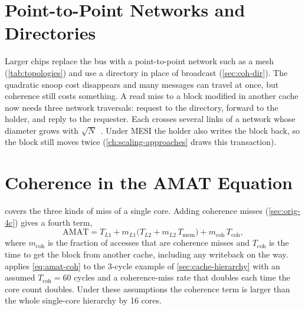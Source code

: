 \section{Point-to-Point Networks and Directories}
\label{sec:scale-p2p}
%

Larger chips replace the bus with a point-to-point network such as a mesh
(\cref{tab:topologies}) and use a directory in place of broadcast
(\cref{sec:coh-dir}). The quadratic snoop cost disappears and many messages can
travel at once, but coherence still costs something. A read miss to a block
modified in another cache now needs three network traversals: request to the
directory, forward to the holder, and reply to the requester. Each crosses several
links of a network whose diameter grows with
$\sqrt{N}$~\cite[\S12.6.3]{sarangi2025basic}. Under MESI the holder also writes
the block back, so the block still moves twice (\cref{ch:scaling-approaches}
draws this transaction).

\section{Coherence in the AMAT Equation}
\label{sec:scale-amat}
%

 covers the three kinds of miss of a single core. Adding coherence
misses (\cref{sec:orig-4c}) gives a fourth term,
\begin{equation}
  \mathrm{AMAT} = T_{L1} + m_{L1}\bigl(T_{L2} + m_{L2}\,T_{\mathrm{mem}}\bigr)
                + m_{\mathrm{coh}}\,T_{\mathrm{coh}},
  \label{eq:amat-coh}
\end{equation}
where $m_{\mathrm{coh}}$ is the fraction of accesses that are coherence misses and
$T_{\mathrm{coh}}$ is the time to get the block from another cache, including any
writeback on the way.  applies \cref{eq:amat-coh} to the
3-cycle example of \cref{sec:cache-hierarchy} with an assumed
$T_{\mathrm{coh}}=60$ cycles and a coherence-miss rate that doubles each time the
core count doubles. Under these assumptions the coherence term is larger than the
whole single-core hierarchy by 16 cores.

